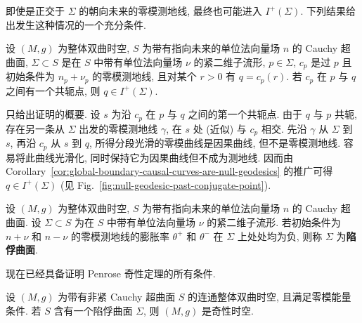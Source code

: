 即使是正交于 $\Sigma$ 的朝向未来的零模测地线, 最终也可能进入 $I^+(\Sigma)$. 下列结果给出发生这种情况的一个充分条件.

\begin{RiemannProposition}\label{prop:null-geodesic-enters-chronological-future-past-conjugate-point}
设 $(M,g)$ 为整体双曲时空, $S$ 为带有指向未来的单位法向量场 $n$ 的 Cauchy 超曲面, $\Sigma\subset S$ 是在 $S$ 中带有单位法向量场 $\nu$ 的紧二维子流形, $p\in\Sigma$, $c_p$ 是过 $p$ 且初始条件为 $n_p+\nu_p$ 的零模测地线, 且对某个 $r>0$ 有 $q=c_p(r)$. 若 $c_p$ 在 $p$ 与 $q$ 之间有一个共轭点, 则 $q\in I^+(\Sigma)$.
\end{RiemannProposition}

\begin{RiemannProof}
只给出证明的概要. 设 $s$ 为沿 $c_p$ 在 $p$ 与 $q$ 之间的第一个共轭点. 由于 $q$ 与 $p$ 共轭, 存在另一条从 $\Sigma$ 出发的零模测地线 $\gamma$, 在 $s$ 处 (近似) 与 $c_p$ 相交. 先沿 $\gamma$ 从 $\Sigma$ 到 $s$, 再沿 $c_p$ 从 $s$ 到 $q$, 所得分段光滑的零模曲线是因果曲线, 但不是零模测地线. 容易将此曲线光滑化, 同时保持它为因果曲线但不成为测地线. 因而由 Corollary~\ref{cor:global-boundary-causal-curves-are-null-geodesics} 的推广可得 $q\in I^+(\Sigma)$ (见 Fig.~\ref{fig:null-geodesic-past-conjugate-point}).
\end{RiemannProof}

\begin{RiemannDefinition}\label{def:trapped-surface}
设 $(M,g)$ 为整体双曲时空, $S$ 为带有指向未来的单位法向量场 $n$ 的 Cauchy 超曲面. 设 $\Sigma\subset S$ 为在 $S$ 中带有单位法向量场 $\nu$ 的紧二维子流形. 若初始条件为 $n+\nu$ 和 $n-\nu$ 的零模测地线的膨胀率 $\theta^+$ 和 $\theta^-$ 在 $\Sigma$ 上处处均为负, 则称 $\Sigma$ 为\textbf{陷俘曲面}.
\end{RiemannDefinition}

现在已经具备证明 Penrose 奇性定理的所有条件.

\begin{RiemannTheorem}[Penrose]\label{thm:penrose-null-singularity}
设 $(M,g)$ 为带有非紧 Cauchy 超曲面 $S$ 的连通整体双曲时空, 且满足零模能量条件. 若 $S$ 含有一个陷俘曲面 $\Sigma$, 则 $(M,g)$ 是奇性时空.
\end{RiemannTheorem}

